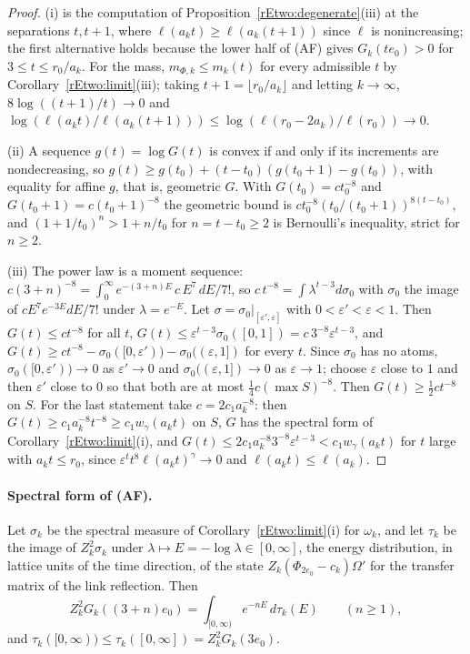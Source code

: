 \begin{proof}
(i) is the computation of Proposition~\ref{rEtwo:degenerate}(iii) at the
separations $t,t+1$, where $\ell(a_kt)\ge\ell(a_k(t+1))$ since $\ell$ is
nonincreasing; the first alternative holds because the lower half of (AF)
gives $G_k(te_0)>0$ for $3\le t\le r_0/a_k$. For the mass, $m_{\Phi,k}\le
m_k(t)$ for every admissible $t$ by Corollary~\ref{rEtwo:limit}(iii);
taking $t+1=\lfloor r_0/a_k\rfloor$ and letting $k\to\infty$, $8\log((t+1)/
t)\to0$ and $\log(\ell(a_kt)/\ell(a_k(t+1)))\le\log(\ell(r_0-2a_k)/\ell(
r_0))\to0$.

(ii) A sequence $g(t)=\log G(t)$ is convex if and only if its increments
are nondecreasing, so $g(t)\ge g(t_0)+(t-t_0)(g(t_0+1)-g(t_0))$, with
equality for affine $g$, that is, geometric $G$. With $G(t_0)=ct_0^{-8}$
and $G(t_0+1)=c(t_0+1)^{-8}$ the geometric bound is $ct_0^{-8}(t_0/(t_0+1))
^{8(t-t_0)}$, and $(1+1/t_0)^{n}>1+n/t_0$ for $n=t-t_0\ge2$ is Bernoulli's
inequality, strict for $n\ge2$.

(iii) The power law is a moment sequence: $c(3+n)^{-8}=\int_0^\infty
e^{-(3+n)E}\,c\,E^7\,dE/7!$, so $c\,t^{-8}=\int\lambda^{t-3}d\sigma_0$ with
$\sigma_0$ the image of $cE^7e^{-3E}dE/7!$ under $\lambda=e^{-E}$. Let
$\sigma=\sigma_0|_{[\varepsilon',\varepsilon]}$ with $0<\varepsilon'<\varepsilon<1$.
Then $G(t)\le ct^{-8}$ for all $t$, $G(t)\le\varepsilon^{t-3}\sigma_0([0,1])
=c\,3^{-8}\varepsilon^{t-3}$, and $G(t)\ge ct^{-8}-\sigma_0([0,\varepsilon'))
-\sigma_0((\varepsilon,1])$ for every $t$. Since
$\sigma_0$ has no atoms, $\sigma_0([0,\varepsilon'))\to0$ as $\varepsilon'
\to0$ and $\sigma_0((\varepsilon,1])\to0$ as $\varepsilon\to1$; choose
$\varepsilon$ close to $1$ and then $\varepsilon'$ close to $0$ so that both
are at most $\tfrac14c(\max S)^{-8}$. Then $G(t)\ge\tfrac12ct^{-8}$ on $S$.
For the last statement take $c=2c_1a_k^{-8}$: then $G(t)\ge c_1a_k^{-8}
t^{-8}\ge c_1w_\gamma(a_kt)$ on $S$, $G$ has the spectral form of
Corollary~\ref{rEtwo:limit}(i), and $G(t)\le2c_1a_k^{-8}3^{-8}\varepsilon^{
t-3}<c_1w_\gamma(a_kt)$ for $t$ large with $a_kt\le r_0$, since
$\varepsilon^{t}t^{8}\ell(a_kt)^\gamma\to0$ and $\ell(a_kt)\le\ell(a_k)$.
\end{proof}

\paragraph{Spectral form of (AF).} Let $\sigma_k$ be the spectral measure
of Corollary~\ref{rEtwo:limit}(i) for $\omega_k$, and let $\tau_k$ be the
image of $Z_k^2\sigma_k$ under $\lambda\mapsto E=-\log\lambda\in[0,\infty]$,
the energy distribution, in lattice units of the time direction, of the
state $Z_k(\Phi_{2e_0}-c_k)\Omega'$ for the transfer matrix of the link
reflection. Then
\begin{equation}\label{rEtwo:eqlaplace}
Z_k^2G_k((3+n)e_0)=\int_{[0,\infty)}e^{-nE}\,d\tau_k(E)\qquad(n\ge1),
\end{equation}
and $\tau_k([0,\infty))\le\tau_k([0,\infty])=Z_k^2G_k(3e_0)$.

